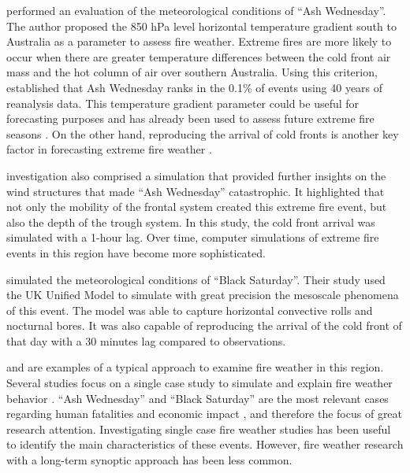 \citet{Mills2005} performed an evaluation of the meteorological conditions
of ``Ash Wednesday''. The author proposed the 850 hPa level horizontal
temperature gradient south to Australia as a parameter to assess fire
weather. Extreme fires are more likely to occur when there are greater
temperature differences between the cold front air mass and the hot
column of air over southern Australia. Using this criterion, \citet{Mills2005}
established that \textquotedbl{}Ash Wednesday\textquotedbl{} ranks
in the 0.1\% of events using 40 years of reanalysis data. This temperature
gradient parameter could be useful for forecasting purposes and has
already been used to assess future extreme fire seasons \citep{Hasson2009}.
On the other hand, reproducing the arrival of cold fronts is another
key factor in forecasting extreme fire weather \citep{Mills2005,Engel2013}. 

\citet{Mills2005} investigation also comprised a simulation that
provided further insights on the wind structures that made \textquotedblleft Ash
Wednesday\textquotedblright{} catastrophic. It highlighted that not
only the mobility of the frontal system created this extreme fire
event, but also the depth of the trough system. In this study, the
cold front arrival was simulated with a 1-hour lag. Over time, computer
simulations of extreme fire events in this region have become more
sophisticated. 

\citet{Engel2013} simulated the meteorological conditions of ``Black
Saturday''. Their study used the UK Unified Model to simulate with
great precision the mesoscale phenomena of this event. The model was
able to capture horizontal convective rolls and nocturnal bores. It
was also capable of reproducing the arrival of the cold front of that
day with a 30 minutes lag compared to observations.

\citet{Mills2005} and \citet{Engel2013} are examples of a typical
approach to examine fire weather in this region. Several studies focus
on a single case study to simulate and explain fire weather behavior
\citep{Mills2005,Mills2005a,Cruz2012,Engel2013}. \textquotedblleft Ash
Wednesday\textquotedblright{} and ``Black Saturday'' are the most
relevant cases regarding human fatalities and economic impact \citep{Blanchi2010,Blanchi2012},
and therefore the focus of great research attention. Investigating
single case fire weather studies has been useful to identify the main
characteristics of these events. However, fire weather research with
a long-term synoptic approach has been less common. 

